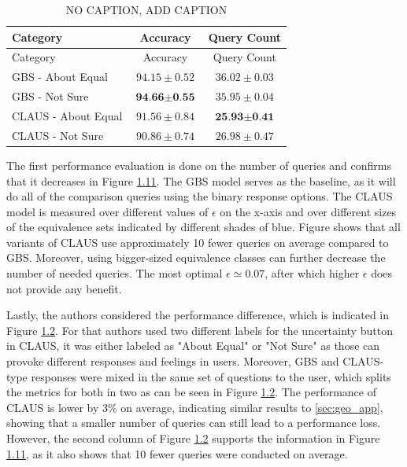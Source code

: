 \documentclass[
  letterpaper,
  DIV=11,
  numbers=noendperiod,
  oneside]{scrreprt}
\theoremstyle{remark}
\begin{document}
\label{fig:claus_tab}
\begin{longtable}[]{@{}lcc@{}}
\caption{NO CAPTION, ADD CAPTION}\tabularnewline
\toprule\noalign{}
Category & Accuracy & Query Count \\
\midrule\noalign{}
\endfirsthead
\toprule\noalign{}
Category & Accuracy & Query Count \\
\midrule\noalign{}
\endhead
\bottomrule\noalign{}
\endlastfoot
GBS - About Equal & \(94.15 \pm 0.52\) & \(36.02 \pm 0.03\) \\
GBS - Not Sure & \(\textbf{94.66} \pm \textbf{0.55}\) &
\(35.95 \pm 0.04\) \\
CLAUS - About Equal & \(91.56 \pm 0.84\) &
\(\textbf{25.93} \pm \textbf{0.41}\) \\
CLAUS - Not Sure & \(90.86 \pm 0.74\) & \(26.98 \pm 0.47\) \\
\end{longtable}

The first performance evaluation is done on the number of queries and
confirms that it decreases in Figure \hyperref[fig:claus_num]{1.11}. The
GBS model serves as the baseline, as it will do all of the comparison
queries using the binary response options. The CLAUS model is measured
over different values of \(\epsilon\) on the x-axis and over different
sizes of the equivalence sets indicated by different shades of blue.
Figure shows that all variants of CLAUS use approximately 10 fewer
queries on average compared to GBS. Moreover, using bigger-sized
equivalence classes can further decrease the number of needed queries.
The most optimal \(\epsilon \simeq 0.07\), after which higher
\(\epsilon\) does not provide any benefit.

Lastly, the authors considered the performance difference, which is
indicated in Figure \hyperref[fig:claus_tab]{1.2}. For that authors used
two different labels for the uncertainty button in CLAUS, it was either
labeled as "About Equal" or "Not Sure" as those can provoke different
responses and feelings in users. Moreover, GBS and CLAUS-type responses
were mixed in the same set of questions to the user, which splits the
metrics for both in two as can be seen in Figure
\hyperref[fig:claus_tab]{1.2}. The performance of CLAUS is lower by
\(3\%\) on average, indicating similar results to
\hyperref[sec:geo_app]{{[}sec:geo\_app{]}}, showing that a smaller
number of queries can still lead to a performance loss. However, the
second column of Figure \hyperref[fig:claus_tab]{1.2} supports the
information in Figure \hyperref[fig:claus_num]{1.11}, as it also shows
that 10 fewer queries were conducted on average.
\end{document}
